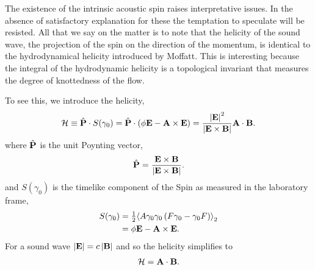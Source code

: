 
The existence of the intrinsic acoustic spin raises  interpretative issues.
In the absence of satisfactory explanation for these the temptation to speculate will be resisted.
All that we say on the matter is to note that the helicity of the sound wave, 
the projection of the spin on the direction of the momentum, 
is identical to the hydrodynamical helicity introduced by Moffatt\cite{Moffatt1969}.
This is interesting because the integral of the hydrodynamic helicity is a topological invariant that measures the degree of knottedness of the flow\cite{Moffatt1969}.

To see this, we introduce the helicity,
\begin{align}
  {\cal H} \equiv   \hat {\mathbf{P}} \cdot S(\gamma_0) = \hat {\mathbf{P}} \cdot \left( \phi \mathbf{E} - \textbf{A} \times\mathbf{E} \right) =  \frac{\left| \mathbf{E} \right|^2}{\left| \mathbf{E}\times\mathbf{B} \right|}\textbf{A} \cdot \mathbf{B}.
\end{align}
where  $\hat {\mathbf{P}}$ is the unit  Poynting vector, 
\begin{align}
 \hat{\mathbf{P}} =\frac{\mathbf{E} \times \mathbf{B}}{\left| \mathbf{E}\times\mathbf{B} \right|}.
\end{align}
and $S(\gamma_0)$ is the timelike component of the Spin 
as measured in the laboratory frame,
\begin{align}
 S(\gamma_0) %
 &= \half\bivector{A\g \g \lr{F\g - \g F}}\\
 &= \phi\vE - \vA \times \vE.
\end{align}
For a sound wave
$\left| \mathbf{E} \right| = c\left| \mathbf{B} \right|$
and so the helicity simplifies to
\begin{align}
  \label{eqn:Helicity}
{\cal H} = \textbf{A} \cdot \mathbf{B}.
\end{align}

